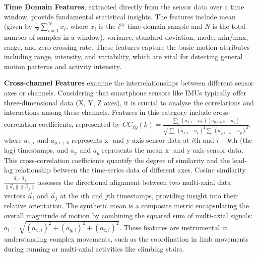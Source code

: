 \textbf{Time Domain Features}, extracted directly from the sensor data over a time window, provide fundamental statistical insights. The features include mean (given by $\frac{1}{N} \sum_{i=1}^{N} x_i$, where $x_i$ is the $i^{th}$ time-domain sample and $N$ is the total number of samples in a window), variance, standard deviation, mode, min/max, range, and zero-crossing rate. These features capture the basic motion attributes including range, intensity, and variability, which are vital for detecting general motion patterns and activity intensity.

\textbf{Cross-channel Features} examine the interrelationships between different sensor axes or channels. Considering that smartphone sensors like IMUs typically offer three-dimensional data (X, Y, Z axes), it is crucial to analyse the correlations and interactions among these channels. Features in this category include cross-correlation coefficients, represented by $CC_{xy}(k) = \frac{\sum_{i} (a_{x,i} - \bar{a}_x)(a_{y,i+k} - \bar{a}_y)}{\sqrt{\sum_{i}(a_{x,i} - \bar{a}_x)^2 \sum_{i}(a_{y,i+k} - \bar{a}_y)^2}}$, where $a_{x,i}$ and  $a_{y, i+k}$ represents x- and y-axis sensor data at $i$th and $i+k$th (the lag) timestamps, and $\bar{a}_x$ and $\bar{a}_y$ represents the mean x- and y-axis sensor data. This cross-correlation coefficients quantify the degree of similarity and the lead-lag relationship between the time-series data of different axes. Cosine similarity $\frac{\vec{a}_i \cdot \vec{a}_j}{\|\vec{a}_i\|\|\vec{a}_j\|}$ assesses the directional alignment between two multi-axial data vectors $\vec{a}_i$ and $\vec{a}_j$ at the $i$th and $j$th timestamps, providing insight into their relative orientation. The synthetic mean is a composite metric encapsulating the overall magnitude of motion by combining the squared sum of multi-axial signals: $a_i = \sqrt{(a_{x,i})^2 + (a_{y,i})^2 + (a_{z,i})^2}$. These features are instrumental in understanding complex movements, such as the coordination in limb movements during running or multi-axial activities like climbing stairs.

